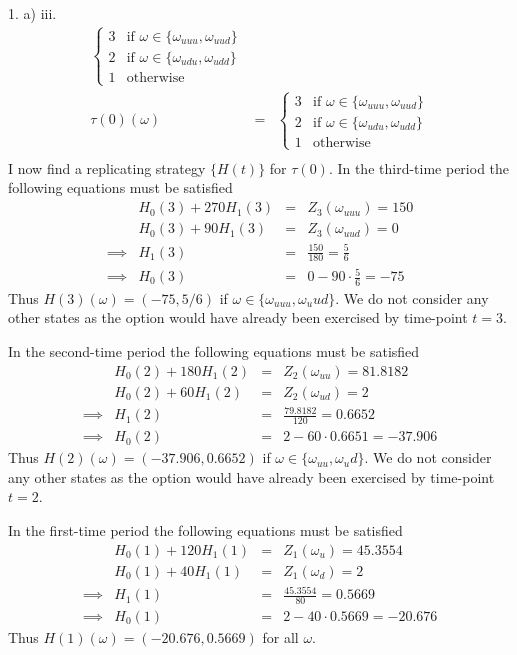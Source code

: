 \documentclass[11pt,a4paper]{article}
\begin{document}
\begin{answer}{1. a) iii.}
\[\begin{array}{rcl}
\begin{cases}
      3&\text{if }\omega\in\{\omega_{uuu},\omega_{uud}\}\\
      2&\text{if }\omega\in\{\omega_{udu},\omega_{udd}\}\\
      1&\text{otherwise}
    \end{cases}\\
    \tau(0)(\omega)&=&\begin{cases}
      3&\text{if }\omega\in\{\omega_{uuu},\omega_{uud}\}\\
      2&\text{if }\omega\in\{\omega_{udu},\omega_{udd}\}\\
      1&\text{otherwise}
    \end{cases}\\
  \end{array}\]
  I now find a replicating strategy $\{H(t)\}$ for $\tau(0)$. In the third-time period the following equations must be satisfied
  \[\begin{array}{rrcl}
    &H_0(3)+270H_1(3)&=&Z_3(\omega_{uuu})=150\\
    &H_0(3)+90H_1(3)&=&Z_3(\omega_{uud})=0\\
    \implies&H_1(3)&=&\frac{150}{180}=\frac56\\
    \implies&H_0(3)&=&0-90\cdot\frac56=-75
  \end{array}\]
  Thus $H(3)(\omega)=(-75,5/6)$ if $\omega\in\{\omega_{uuu},\omega_uud\}$. We do not consider any other states as the option would have already been exercised by time-point $t=3$.
  \par In the second-time period the following equations must be satisfied
  \[\begin{array}{rrcl}
    &H_0(2)+180H_1(2)&=&Z_2(\omega_{uu})=81.8182\\
    &H_0(2)+60H_1(2)&=&Z_2(\omega_{ud})=2\\
    \implies&H_1(2)&=&\frac{79.8182}{120}=0.6652\\
    \implies&H_0(2)&=&2-60\cdot0.6651=-37.906
  \end{array}\]
  Thus $H(2)(\omega)=(-37.906,0.6652)$ if $\omega\in\{\omega_{uu},\omega_ud\}$. We do not consider any other states as the option would have already been exercised by time-point $t=2$.
  \par In the first-time period the following equations must be satisfied
  \[\begin{array}{rrcl}
    &H_0(1)+120H_1(1)&=&Z_1(\omega_{u})=45.3554\\
    &H_0(1)+40H_1(1)&=&Z_1(\omega_{d})=2\\
    \implies&H_1(1)&=&\frac{45.3554}{80}=0.5669\\
    \implies&H_0(1)&=&2-40\cdot0.5669=-20.676
  \end{array}\]
  Thus $H(1)(\omega)=(-20.676,0.5669)$ for all $\omega$.
\end{answer}
\end{document}
